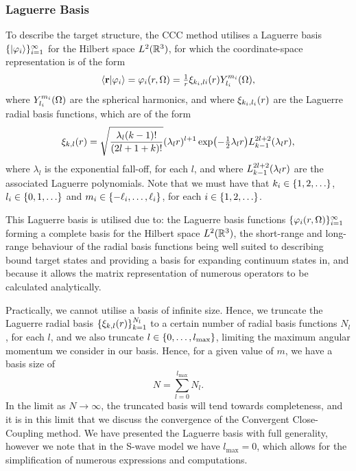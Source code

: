 \documentclass[draft]{article}
\begin{document}
\subsubsection{Laguerre Basis}
\label{sec:laguerre-basis}

To describe the target structure, the CCC method utilises a Laguerre basis
$\lbrace\ket{\varphi_{i}}\rbrace_{i = 1}^{\infty}$ for the Hilbert space
$L^{2}(\mathbb{R}^{3})$, for which the coordinate-space representation is of the
form
\begin{equation}
  \label{eq:laguerre-basis}
  \bra{\vb{r}}
  \ket{\varphi_{i}}
  =
  \varphi_{i}(r, \Omega)
  =
  \tfrac{1}{r}
  \xi_{k_{i}, l{i}}(r)
  Y_{l_{i}}^{m_{i}}(\Omega)
  ,
\end{equation}
where $Y_{l_{i}}^{m_{i}}(\Omega)$ are the spherical harmonics, and where
$\xi_{k_{i}, l_{i}}(r)$ are the Laguerre radial basis functions, which are of
the form
\begin{equation}
  \label{eq:laguerre-radial-basis}
  \xi_{k, l}\lr{r}
  =
  \sqrt
  {
    \dfrac
    {
      \lambda_{l}
      \lr{k - 1}!
    }
    {
      \lr{2l + 1 + k}!
    }
  }
  \lr{\lambda_{l} r}^{l + 1}
  \exponential\lr[\big]{- \tfrac{1}{2} \lambda_{l} r}
  L_{k - 1}^{2l + 2}\lr{\lambda_{l} r}
  ,
\end{equation}
where $\lambda_{l}$ is the exponential fall-off, for each $l$, and where
$L_{k - 1}^{2l + 2}(\lambda_{l} r)$ are the associated Laguerre polynomials.
Note that we must have that
$k_{i} \in \lrset{1, 2, \dotsc}$,
$l_{i} \in \lrset{0, 1, \dotsc}$ and
$m_{i} \in \lbrace-\ell_{i}, \dotsc, \ell_{i}\rbrace$, for each
$i \in \lrset{1, 2, \dotsc}$.

This Laguerre basis is utilised due to: the Laguerre basis functions
$\lbrace\varphi_{i}(r, \Omega)\rbrace_{i = 1}^{\infty}$ forming a complete basis
for the Hilbert space $L^{2}(\mathbb{R}^{3})$, the short-range and long-range
behaviour of the radial basis functions being well suited to describing bound
target states and providing a basis for expanding continuum states in, and
because it allows the matrix representation of numerous operators to be
calculated analytically.

Practically, we cannot utilise a basis of infinite size.
Hence, we truncate the Laguerre radial basis
$\lbrace\xi_{k, l}(r)\rbrace_{k = 1}^{N_{l}}$ to a certain number of radial basis
functions $N_{l}$, for each $l$, and we also truncate
$l \in \lbrace0, \dotsc, l_{\max}\rbrace$,
limiting the maximum angular momentum we consider in our basis.
Hence, for a given value of $m$, we have a basis size of
\begin{equation}
  \label{eq:basis-size}
  N
  =
  \sum_{l = 0}^{l_{\max}}
  N_{l}
  .
\end{equation}
In the limit as $N \to \infty$, the truncated basis will tend towards
completeness, and it is in this limit that we discuss the convergence of the
Convergent Close-Coupling method.
We have presented the Laguerre basis with full generality, however we note that
in the S-wave model we have $l_{\max} = 0$, which allows for the simplification
of numerous expressions and computations.
\end{document}
